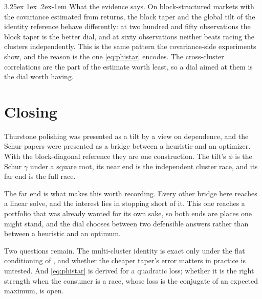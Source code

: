 \documentclass[11pt]{article}
\makeatletter
\renewcommand\paragraph{\@startsection{paragraph}{4}{\z@}%
  {3.25ex \@plus1ex \@minus.2ex}{-1em}%
  {\normalfont\normalsize\itshape}}
\makeatother
\begin{document}
\paragraph{What the evidence says.} On block-structured markets with the
covariance estimated from returns, the block taper and the global tilt of the
identity reference behave differently: at two hundred and fifty observations the
block taper is the better dial, and at sixty observations neither beats racing
the clusters independently. This is the same pattern the covariance-side
experiments show, and the reason is the one \eqref{eq:phistar} encodes. The
cross-cluster correlations are the part of the estimate worth least, so a dial
aimed at them is the dial worth having.

\section{Closing}

Thurstone polishing was presented as a tilt by a view on dependence, and the
Schur papers were presented as a bridge between a heuristic and an optimizer.
With the block-diagonal reference they are one construction. The tilt's $\phi$
is the Schur $\gamma$ under a square root, its near end is the independent
cluster race, and its far end is the full race.

The far end is what makes this worth recording. Every other bridge here reaches
a linear solve, and the interest lies in stopping short of it. This one reaches
a portfolio that was already wanted for its own sake, so both ends are places
one might stand, and the dial chooses between two defensible answers rather than
between a heuristic and an optimum.

Two questions remain. The multi-cluster identity is exact only under the flat
conditioning of \cite{cotton2026nco}, and whether the cheaper taper's error
matters in practice is untested. And \eqref{eq:phistar} is derived for a
quadratic loss; whether it is the right strength when the consumer is a race,
whose loss is the conjugate of an expected maximum, is open.
\end{document}
